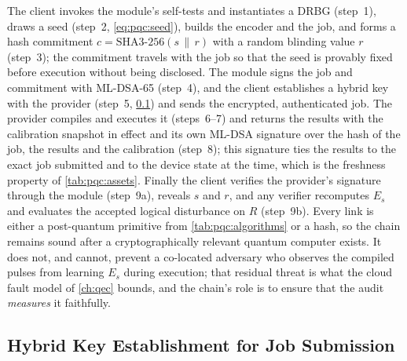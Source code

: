 The client invokes the module's self-tests and instantiates a DRBG (step~1), draws a seed (step~2, \cref{eq:pqc:seed}), builds the encoder and the job, and forms a hash commitment $c=\mathrm{SHA3\text{-}256}(s\,\|\,r)$ with a random blinding value $r$ (step~3); the commitment travels with the job so that the seed is provably fixed before execution without being disclosed. The module signs the job and commitment with ML-DSA-65 (step~4), and the client establishes a hybrid key with the provider (step~5, \cref{sec:pqc:hybrid}) and sends the encrypted, authenticated job. The provider compiles and executes it (steps~6--7) and returns the results with the calibration snapshot in effect and its own ML-DSA signature over the hash of the job, the results and the calibration (step~8); this signature ties the results to the exact job submitted and to the device state at the time, which is the freshness property of \cref{tab:pqc:assets}. Finally the client verifies the provider's signature through the module (step~9a), reveals $s$ and $r$, and any verifier recomputes $E_s$ and evaluates the accepted logical disturbance on $R$ (step~9b). Every link is either a post-quantum primitive from \cref{tab:pqc:algorithms} or a hash, so the chain remains sound after a cryptographically relevant quantum computer exists. It does not, and cannot, prevent a co-located adversary who observes the compiled pulses from learning $E_s$ during execution; that residual threat is what the cloud fault model of \cref{ch:qec} bounds, and the chain's role is to ensure that the audit \emph{measures} it faithfully.

\subsection{Hybrid Key Establishment for Job Submission}\label{sec:pqc:hybrid}

